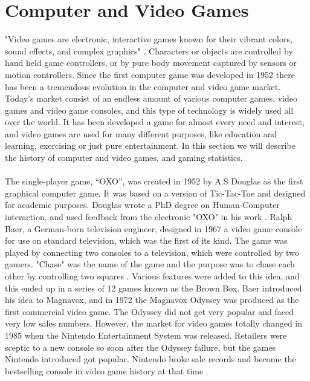\section{Computer and Video Games}
"Video games are electronic, interactive games known for their vibrant colors, sound effects, and complex graphics" \cite{videogamedef}. Characters or objects are controlled by hand held game controllers, or by pure body movement captured by sensors or motion controllers. Since the first computer game was developed in 1952 there has been a tremendous evolution in the computer and video game market. Today's market consist of an endless amount of various computer games, video games and video game consoles, and this type of technology is widely used all over the world. It has been developed a game for almost every need and interest, and video games are used for many different purposes, like education and learning, exercising or just pure entertainment. In this section we will describe the history of computer and video games, and gaming statistics. \\ \\
The single-player game, “OXO”, was created in 1952 by A.S Douglas as the first graphical computer game. It was based on a version of Tic-Tac-Toe and designed for academic purposes.  Douglas wrote a PhD degree on Human-Computer interaction, and used feedback from the electronic "OXO" in his work \cite{abouthiginbotham}. Ralph Baer, a German-born television engineer, designed in 1967 a video game console for use on standard television, which was the first of its kind. The game was played by connecting two consoles to a television, which were controlled by two gamers. "Chase" was the name of the game and the purpose was to chase each other by controlling two squares \cite{videogameHistory}. Various features were added to this idea, and this ended up in a series of 12 games known as the Brown Box. Baer introduced his idea to Magnavox, and in 1972 the Magnavox Odyssey was produced as the first commercial video game. The Odyssey did not get very popular and faced very low sales numbers. However, the market for video games totally changed in 1985 when the Nintendo Entertainment System was released. Retailers were sceptic to a new console so soon after the Odyssey failure, but the games Nintendo introduced got popular. Nintendo broke sale records and become the bestselling console in video game history at that time \cite{consoleHistory}. \\ \\
